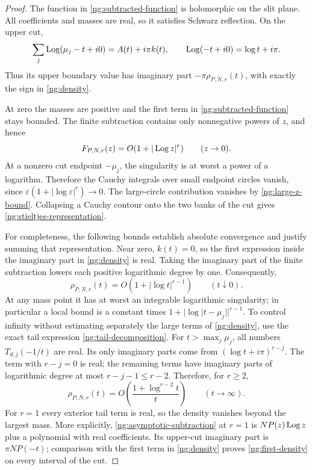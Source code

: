 \begin{proof}
The function in \eqref{ng:subtracted-function} is holomorphic
on the slit plane.  All coefficients and masses are real, so
it satisfies Schwarz reflection.  On the upper cut,
\[
 \sum_j\operatorname{Log}(\mu_j-t+i0)=A(t)+i\pi k(t),\qquad
 \operatorname{Log}(-t+i0)=\log t+i\pi.
\]
Thus its upper boundary value has imaginary part
$-\pi\rho_{P,N,r}(t)$, with exactly the sign in
\eqref{ng:density}.

At zero the masses are positive and the first term in
\eqref{ng:subtracted-function} stays bounded.  The finite
subtraction contains only nonnegative powers of $z$, and hence
\[
 F_{P,N,r}(z)=O(1+|\operatorname{Log} z|^r)\qquad(z\to0).
\]
At a nonzero cut endpoint $-\mu_j$, the singularity is at worst
a power of a logarithm.  Therefore the Cauchy integrals over
small endpoint circles vanish, since
$\varepsilon(1+|\log\varepsilon|^r)\to0$.
The large-circle contribution vanishes by
\eqref{ng:large-z-bound}.  Collapsing a Cauchy contour onto the
two banks of the cut gives \eqref{ng:stieltjes-representation}.

For completeness, the following bounds establish absolute
convergence and justify summing that representation.  Near zero,
$k(t)=0$, so the first expression inside the imaginary part in
\eqref{ng:density} is real.  Taking the imaginary part of the
finite subtraction lowers each positive logarithmic degree
by one.  Consequently,
\begin{equation}
 \rho_{P,N,r}(t)=O(1+|\log t|^{r-1})\qquad(t\downarrow0).
 \label{ng:zero-bound}
\end{equation}
At any mass point it has at worst an integrable logarithmic
singularity; in particular a local bound is a constant times
$1+|\log|t-\mu_j||^{r-1}$.
To control infinity without estimating separately the large
terms of \eqref{ng:density}, use the exact tail expression
\eqref{ng:tail-decomposition}.
For $t>\max_j\mu_j$, all numbers $T_{d,j}(-1/t)$ are real.
Its only imaginary parts come from
$(\log t+i\pi)^{r-j}$.  The term with $r-j=0$ is real; the
remaining terms have imaginary parts of logarithmic degree at
most $r-j-1\leq r-2$.  Therefore, for $r\geq2$,
\begin{equation}
 \rho_{P,N,r}(t)
       =O\left(\frac{1+\log^{r-2}t}{t}\right)
                          \qquad(t\to\infty).
 \label{ng:infinity-bound}
\end{equation}
For $r=1$ every exterior tail term is real, so the density
vanishes beyond the largest mass.  More explicitly,
\eqref{ng:asymptotic-subtraction} at $r=1$ is
$NP(z)\operatorname{Log} z$ plus a polynomial with real coefficients.
Its upper-cut imaginary part is $\pi NP(-t)$; comparison with
the first term in \eqref{ng:density} proves
\eqref{ng:first-density} on every interval of the cut.


\end{proof}
